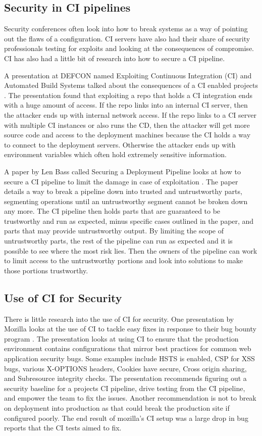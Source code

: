 \subsection{Security in CI pipelines}
	Security conferences often look into how to break systems as a way of pointing out the flaws of a configuration. CI servers have also had their share of security professionals testing for exploits
    and looking at the consequences of compromise. CI has also had a little bit of research into how to secure a CI pipeline.

	A presentation at DEFCON named Exploiting Continuous Integration (CI) and Automated Build Systems talked about the consequences of a CI enabled projects \cite{spaceb0x}. The presentation found that 
    exploiting a repo that holds a CI integration ends with a huge amount of access. If the repo links into an internal CI server, then the attacker ends up with internal network access. If the repo 
    links to a CI server with multiple CI instances or also runs the CD, then the attacker will get more source code and access to the deployment machines because the CI holds a way to connect to the 
    deployment servers. Otherwise the attacker ends up with environment variables which often hold extremely sensitive information.

	A paper by Len Bass called Securing a Deployment Pipeline looks at how to secure a CI pipeline to limit the damage in case of exploitation \cite{Bass}. The paper details a way to break a pipeline 
    down into trusted and untrustworthy parts, segmenting operations until an untrustworthy segment cannot be broken down any more. The CI pipeline then holds parts that are guaranteed to be 
    trustworthy and run as expected, minus specific cases outlined in the paper, and parts that may provide untrustworthy output. By limiting the scope of untrustworthy parts, the rest of the pipeline
    can run as expected and it is possible to see where the most risk lies. Then the owners of the pipeline can work to limit access to the untrustworthy portions and look into solutions to make those
    portions trustworthy.

\subsection{Use of CI for Security}
    There is little research into the use of CI for security. One presentation by Mozilla looks at the use of CI to tackle easy fixes in response to their bug bounty program \cite{Vehent}. The 
    presentation looks at using CI to ensure that the production environment contains configurations that mirror best practices for common web application security bugs. Some examples include HSTS
    is enabled, CSP for XSS bugs, various X-OPTIONS headers, Cookies have secure, Cross origin sharing, and Subresource integrity checks. The presentation recommends figuring out a security baseline
    for a projects CI pipeline, drive testing from the CI pipeline, and empower the team to fix the issues. Another recommendation is not to break on deployment into production as that could break the
    production site if configured poorly. The end result of mozilla's CI setup was a large drop in bug reports that the CI tests aimed to fix.

